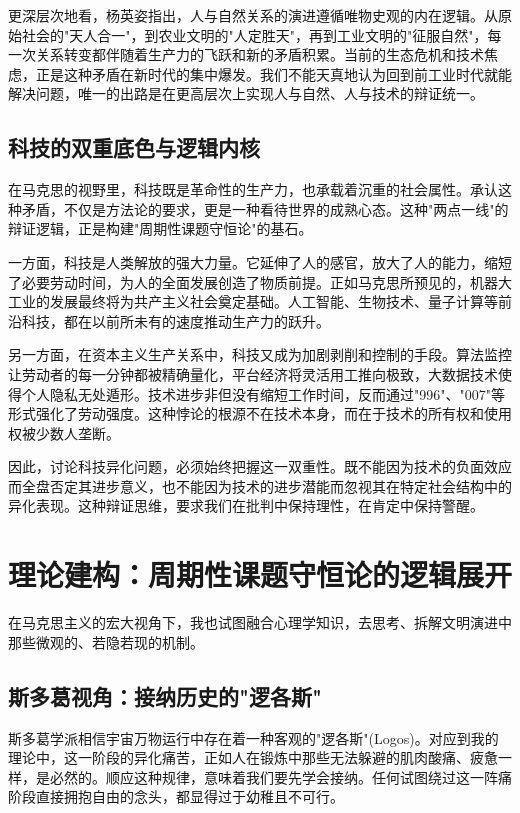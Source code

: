 \documentclass[a4paper,12pt]{ctexart}
\begin{document}
更深层次地看，杨英姿指出，人与自然关系的演进遵循唯物史观的内在逻辑。从原始社会的"天人合一"，到农业文明的"人定胜天"，再到工业文明的"征服自然"，每一次关系转变都伴随着生产力的飞跃和新的矛盾积累。当前的生态危机和技术焦虑，正是这种矛盾在新时代的集中爆发。我们不能天真地认为回到前工业时代就能解决问题，唯一的出路是在更高层次上实现人与自然、人与技术的辩证统一。

\subsection{科技的双重底色与逻辑内核}

在马克思的视野里，科技既是革命性的生产力，也承载着沉重的社会属性。承认这种矛盾，不仅是方法论的要求，更是一种看待世界的成熟心态。这种"两点一线"的辩证逻辑，正是构建"周期性课题守恒论"的基石。

一方面，科技是人类解放的强大力量。它延伸了人的感官，放大了人的能力，缩短了必要劳动时间，为人的全面发展创造了物质前提。正如马克思所预见的，机器大工业的发展最终将为共产主义社会奠定基础。人工智能、生物技术、量子计算等前沿科技，都在以前所未有的速度推动生产力的跃升。

另一方面，在资本主义生产关系中，科技又成为加剧剥削和控制的手段。算法监控让劳动者的每一分钟都被精确量化，平台经济将灵活用工推向极致，大数据技术使得个人隐私无处遁形。技术进步非但没有缩短工作时间，反而通过"996"、"007"等形式强化了劳动强度。这种悖论的根源不在技术本身，而在于技术的所有权和使用权被少数人垄断。

因此，讨论科技异化问题，必须始终把握这一双重性。既不能因为技术的负面效应而全盘否定其进步意义，也不能因为技术的进步潜能而忽视其在特定社会结构中的异化表现。这种辩证思维，要求我们在批判中保持理性，在肯定中保持警醒。

\section{理论建构：周期性课题守恒论的逻辑展开}

在马克思主义的宏大视角下，我也试图融合心理学知识，去思考、拆解文明演进中那些微观的、若隐若现的机制。

\subsection{斯多葛视角：接纳历史的"逻各斯"}

斯多葛学派相信宇宙万物运行中存在着一种客观的"逻各斯"(Logos)。对应到我的理论中，这一阶段的异化痛苦，正如人在锻炼中那些无法躲避的肌肉酸痛、疲惫一样，是必然的。顺应这种规律，意味着我们要先学会接纳。任何试图绕过这一阵痛阶段直接拥抱自由的念头，都显得过于幼稚且不可行。
\end{document}
